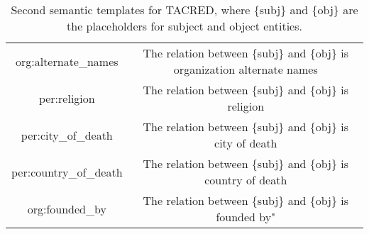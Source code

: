 \begin{table*}[h]
\begin{threeparttable}
\begin{tabular}{cc}
    org:alternate\_names &     The relation between \{subj\} and \{obj\} is organization alternate names\\
    per:religion &     The relation between \{subj\} and \{obj\} is religion\\
    per:city\_of\_death &     The relation between \{subj\} and \{obj\} is city of death\\
    per:country\_of\_death &     The relation between \{subj\} and \{obj\} is country of death\\
    org:founded\_by &     The relation between \{subj\} and \{obj\} is founded by"\\
    \bottomrule
    \end{tabular}
    \end{threeparttable}
    \caption{Second semantic templates for TACRED, where \{subj\} and \{obj\} are the placeholders for subject and object entities.}
    \label{tab:semantic2-templates}
\end{table*}

